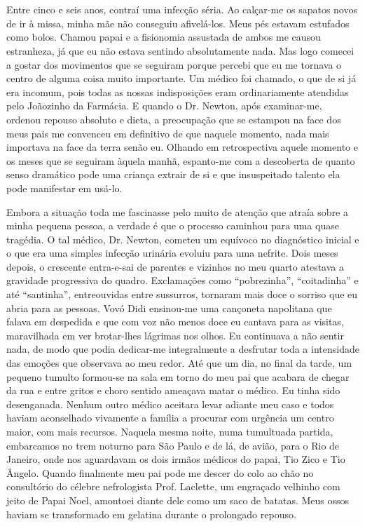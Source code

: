 \chapter{}
Entre cinco e seis anos, contraí uma infecção séria. Ao calçar-me os sapatos novos de ir à missa, minha mãe não conseguiu afivelá-los. 
Meus pés estavam estufados como bolos. 
Chamou papai e a fisionomia assustada de ambos me causou estranheza, já que eu não estava sentindo absolutamente nada. 
Mas logo comecei a gostar dos movimentos que se seguiram porque percebi que eu me tornava o centro de alguma coisa muito importante. 
Um médico foi chamado, o que de si já era incomum, pois todas as nossas indisposições eram ordinariamente atendidas pelo Joãozinho da Farmácia.
E quando o Dr. Newton, após examinar-me, ordenou repouso absoluto e dieta, a preocupação que se estampou na face dos meus pais me convenceu em definitivo de que naquele momento, nada mais importava na face da terra senão eu.  
Olhando em retrospectiva aquele momento e os meses que se seguiram àquela manhã, espanto-me com a descoberta de quanto senso dramático pode uma criança extrair de si e que insuspeitado talento ela pode manifestar em usá-lo. 
 
Embora a situação toda me fascinasse pelo muito de atenção que atraía sobre a minha pequena pessoa, a verdade é que o processo caminhou para uma quase tragédia. 
O tal médico, Dr. Newton, cometeu um equívoco no diagnóstico inicial e o que era uma simples infecção urinária evoluiu para uma nefrite. 
Dois meses depois, o crescente entra-e-sai de parentes e vizinhos no meu quarto atestava a gravidade progressiva do quadro. Exclamações como ``pobrezinha'', ``coitadinha'' e até ``santinha'', entreouvidas entre sussurros, tornaram mais doce o sorriso que eu abria para as pessoas. 
Vovó Didi ensinou-me uma cançoneta napolitana que falava em despedida e que com voz não menos doce eu cantava para as visitas, maravilhada em ver brotar-lhes lágrimas nos olhos. 
Eu continuava a não sentir nada, de modo que podia dedicar-me integralmente a desfrutar toda a intensidade das emoções que observava ao meu redor. 
Até que um dia, no final da tarde, um pequeno tumulto formou-se na sala em torno do meu pai que acabara de chegar da rua e entre gritos e choro sentido ameaçava matar o médico. 
Eu tinha sido desenganada. 
Nenhum outro médico aceitara levar adiante meu caso e todos haviam aconselhado vivamente a família a procurar com urgência um centro maior, com mais recursos.  Naquela mesma noite, numa tumultuada partida, embarcamos no trem noturno para São Paulo e de lá, de avião, para o Rio de Janeiro, onde nos aguardavam os dois irmãos médicos do papai, Tio Zico e Tio Ângelo. 
Quando finalmente meu pai pode me descer do colo ao chão no consultório do célebre nefrologista Prof. Laclette, um engraçado velhinho com jeito de Papai Noel, amontoei diante dele como um saco de batatas. 
Meus ossos haviam se transformado em gelatina durante o prolongado repouso. 

